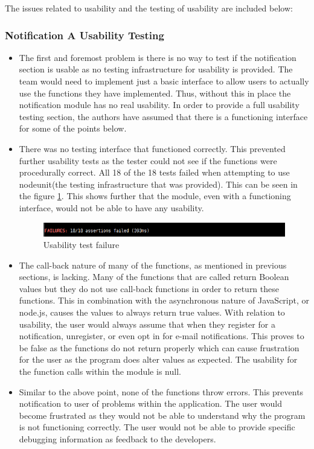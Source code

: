 The issues related to usability and the testing of usability are included below:
\subsubsection{Notification A Usability Testing}
\begin{itemize}
	\item The first and foremost problem is there is no way to test if the notification section is usable as no testing infrastructure for usability is provided. The team would need to implement just a basic interface to allow users to actually use the functions they have implemented. Thus, without this in place the notification module has no real usability. In order to provide a full usability testing section, the authors have assumed that there is a functioning interface for some of the points below.
	\item There was no testing interface that functioned correctly. This prevented further usability tests as the tester could not see if the functions were procedurally correct. All 18 of the 18 tests failed when attempting to use nodeunit(the testing infrastructure that was provided). This can be seen in the figure \ref{fig:usabFailA}. This shows further that the module, even with a functioning interface, would not be able to have any usability.
	\begin{figure}[h!]
		\includegraphics[width=\linewidth]{../images/Failure.png}
		\caption{Usability test failure}
		\label{fig:usabFailA}
	\end{figure}
	\item The call-back nature of many of the functions, as mentioned in previous sections, is lacking. Many of the functions that are called return Boolean values but they do not use call-back functions in order to return these functions. This in combination with the asynchronous nature of JavaScript, or node.js, causes the values to always return true values. With relation to usability, the user would always assume that when they register for a notification, unregister, or even opt in for e-mail notifications. This proves to be false as the functions do not return properly which can cause frustration for the user as the program does alter values as expected. The usability for the function calls within the module is null.
	\item Similar to the above point, none of the functions throw errors. This prevents notification to user of problems within the application. The user would become frustrated as they would not be able to understand why the program is not functioning correctly. The user would not be able to provide specific debugging information as feedback to the developers.

\end{itemize}
